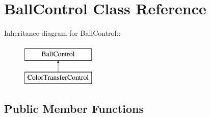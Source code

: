 \hypertarget{classBallControl}{
\section{BallControl Class Reference}
\label{classBallControl}
}
Inheritance diagram for BallControl::\begin{figure}[H]
\begin{center}
\leavevmode
\includegraphics[height=2cm]{classBallControl}
\end{center}
\end{figure}
\subsection*{Public Member Functions}
